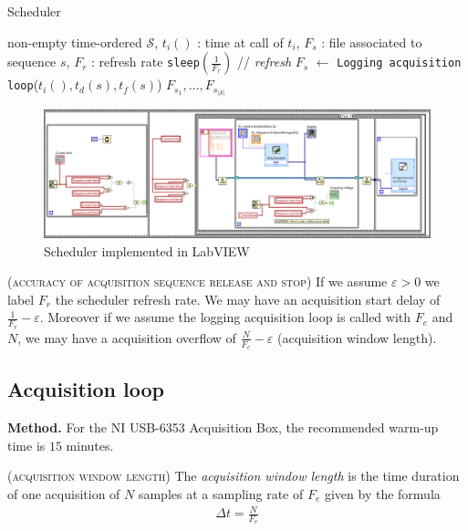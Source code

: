 \documentclass[twocolumn,pre,floats,aps,amsmath,amssymb]{revtex4}
\newenvironment{definition}[1][D\'efinition.]{\begin{trivlist}
\item[\hskip \labelsep {\bfseries #1}]}{\end{trivlist}}
\newenvironment{remark}[1][Remarque.]{\begin{trivlist}
\item[\hskip \labelsep {\bfseries #1}]}{\end{trivlist}}
\begin{document}
\begin{algorithm}[h]
\caption{Scheduler}
\label{algo_timer}
\begin{algorithmic}[1]
  \REQUIRE non-empty time-ordered $\mathcal{S}$, $t_i()$ : time at call of $t_i$, $F_s$ : file associated to sequence $s$, $F_r$ : refresh rate
  \STATE \texttt{sleep}$(\frac{1}{F_r})$ \hfill // \textit{refresh}
  \ENDWHILE
  \STATE $F_s$ $\leftarrow$ \texttt{Logging acquisition loop}($t_i (), t_d (s), t_f (s)$)
  \ENDFOR
  \RETURN $F_{s_1}, \dots, F_{s_{\left | \mathcal{S} \right |}}$
\end{algorithmic}
\end{algorithm}

\begin{figure}[]
  \includegraphics[width=17.5cm]{pictures/minuterie.png}
\caption{Scheduler implemented in LabVIEW}
\label{fig:algo_timer_labview}
\end{figure}

\begin{remark}
  \textsc{(accuracy of acquisition sequence release and stop)}
  If we assume $\varepsilon > 0$ we label $F_r$ the scheduler refresh rate. We may have an acquisition start delay of $\frac{1}{F_r} - \varepsilon$. Moreover if we assume the logging acquisition loop is called with $F_e$ and $N$, we may have a acquisition overflow of $\frac{N}{F_e} - \varepsilon$ (acquisition window length).
\end{remark}

\subsection{Acquisition loop}

\noindent
\textbf{Method.} For the NI USB-6353 Acquisition Box, the recommended warm-up time is $15$ minutes\cite{NI_6353_datasheet}.

\begin{definition}
  (\textsc{acquisition window length})
  The \textit{acquisition window length} is the time duration of one acquisition of $N$ samples at a sampling rate of $F_e$ given by the formula
  \begin{eqnarray*}
    \Delta t = \frac{N}{F_e}
  \end{eqnarray*}
\end{definition}
\end{document}

